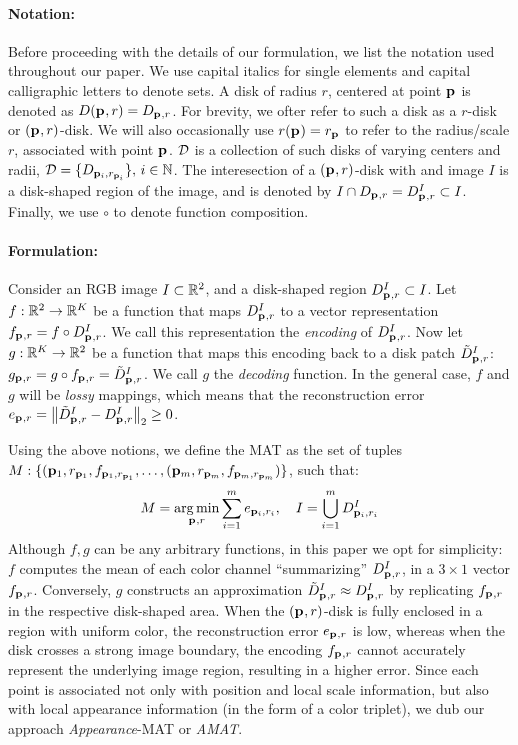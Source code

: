 \documentclass[10pt,twocolumn,letterpaper]{article}
\begin{document}
\paragraph{Notation:} Before proceeding with the details of our formulation, we list the notation used throughout our paper.
We use capital italics for single elements and capital calligraphic letters to denote sets. A disk of radius $r$,
centered at point $\mathbf{p}_{}$ is denoted as $D(\mathbf{p}_{},r)=D_{\mathbf{p}_{},r}$. 
For brevity, we ofter refer to such a disk as a $r$-disk or $(\mathbf{p}_{},r)$-disk.
We will also occasionally use $r(\mathbf{p}_{}) = r_{\mathbf{p}_{}}$ to refer to the radius/scale $r$, associated with point $\mathbf{p}_{}$.
$\mathcal{D}$ is a collection of such disks of varying centers and radii, $\mathcal{D}=\{ D_{\mathbf{p}_{i},r_{\mathbf{p}_{i}}} \},\, i\in\mathbb{N}$.
The interesection of a $(\mathbf{p}_{},r)$-disk with and image $I$ is a disk-shaped region of the image, and is denoted by 
$I \cap D_{\mathbf{p}_{},r}=D_{\mathbf{p}_{},r}^I \subset I$. Finally, we use $\circ$ to denote function composition.

\paragraph{Formulation:} Consider an RGB image $I\subset\mathbb{R}^2$, and a disk-shaped region $D_{\mathbf{p}_{},r}^I \subset I$.
Let $f:\mathbb{R}^2 \rightarrow \mathbb{R}^K$ be a function that maps $D_{\mathbf{p}_{},r}^I$ to a vector representation $f_{\mathbf{p}_{},r}=f\circ D_{\mathbf{p}_{},r}^I$. 
We call this representation the \emph{encoding} of $D_{\mathbf{p}_{},r}^I$. 
Now let $g:\mathbb{R}^K \rightarrow \mathbb{R}^2$ be a function that maps this encoding back to a disk patch $\tilde{D}_{\mathbf{p}_{},r}^I$: 
$g_{\mathbf{p}_{},r} = g \circ f_{\mathbf{p}_{},r} = \tilde{D}_{\mathbf{p}_{},r}^I$. We call $g$ the \emph{decoding} function.
In the general case, $f$ and $g$ will be \emph{lossy} mappings, which means that the reconstruction error 
$e_{\mathbf{p}_{},r} = \left \lVert  \tilde{D}_{\mathbf{p}_{},r}^I - D_{\mathbf{p}_{},r}^I \right \rVert_2 \geq 0$. 

Using the above notions, we define the MAT as the set of tuples 
$M:\{ ( \mathbf{p}_{1},r_{\mathbf{p}_{1}}, f_{\mathbf{p}_{1},r_{\mathbf{p}_{1}}}, \ldots, ( \mathbf{p}_{m},r_{\mathbf{p}_{m}}, f_{\mathbf{p}_{m},r_{\mathbf{p}_{m}}} ) \}$, such that:
\begin{equation}
M = \operatorname*{arg\,min}_{\mathbf{p}_{},r}{\sum_{i=1}^m e_{\mathbf{p}_{i},r_i}},\quad I=\bigcup_{i=1}^m D_{\mathbf{p}_{i},r_i}^I 
\label{eq:minimization}
\end{equation}
Although $f,g$ can be any arbitrary functions, in this paper we opt for simplicity:
$f$ computes the mean of each color channel ``summarizing'' $D_{\mathbf{p}_{},r}^I$, in a $3\times1$ vector $f_{\mathbf{p}_{},r}$.
Conversely, $g$ constructs an approximation $\tilde{D}_{\mathbf{p}_{},r}^I \approx D_{\mathbf{p}_{},r}^I$ by replicating $f_{\mathbf{p}_{},r}$ in the
respective disk-shaped area.
When the $(\mathbf{p}_{},r)$-disk is fully enclosed in a region with uniform color, the reconstruction error $e_{\mathbf{p}_{},r}$
is low, whereas when the disk crosses a strong image boundary, the encoding $f_{\mathbf{p}_{},r}$ cannot accurately represent
the underlying image region, resulting in a higher error. Since each point is associated not only with position and local
scale information, but also with local appearance information (in the form of a color triplet), we dub our approach
\emph{Appearance}-MAT or \emph{AMAT}. 
\end{document}
